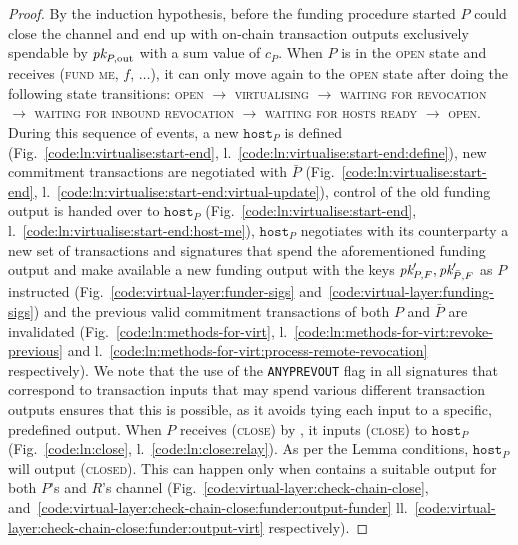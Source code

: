 \begin{proof}
  By the induction hypothesis, before the funding procedure started $P$ could
  close the channel and end up with on-chain transaction outputs exclusively
  spendable by $\textit{pk}_{P, \mathrm{out}}$ with a sum value of $c_P$. When $P$ is in
  the \textsc{open} state and receives (\textsc{fund me}, $f$, $\dots$), it can
  only move again to the \textsc{open} state after doing the following state
  transitions: \textsc{open} $\rightarrow$ \textsc{virtualising} $\rightarrow$
  \textsc{waiting for revocation} $\rightarrow$ \textsc{waiting for inbound
  revocation} $\rightarrow$ \textsc{waiting for hosts ready} $\rightarrow$
  \textsc{open}. During this sequence of events, a new $\texttt{host}_P$ is
  defined (Fig.~\ref{code:ln:virtualise:start-end},
  l.~\ref{code:ln:virtualise:start-end:define}), new commitment transactions are
  negotiated with $\bar{P}$ (Fig.~\ref{code:ln:virtualise:start-end},
  l.~\ref{code:ln:virtualise:start-end:virtual-update}), control of the old
  funding output is handed over to $\texttt{host}_P$
  (Fig.~\ref{code:ln:virtualise:start-end},
  l.~\ref{code:ln:virtualise:start-end:host-me}), $\texttt{host}_P$ negotiates
  with its counterparty a new set of transactions and signatures that spend the
  aforementioned funding output and make available a new funding output with the
  keys $\textit{pk}_{P, F}', \textit{pk}_{\bar{P}, F}'$ as $P$ instructed
  (Fig.~\ref{code:virtual-layer:funder-sigs}
  and~\ref{code:virtual-layer:funding-sigs}) and the previous valid commitment
  transactions of both $P$ and $\bar{P}$ are invalidated
  (Fig.~\ref{code:ln:methods-for-virt},
  l.~\ref{code:ln:methods-for-virt:revoke-previous} and
  l.~\ref{code:ln:methods-for-virt:process-remote-revocation} respectively). We
  note that the use of the \texttt{ANYPREVOUT} flag in all signatures that
  correspond to transaction inputs that may spend various different transaction
  outputs ensures that this is possible, as it avoids tying each input to a
  specific, predefined output. When $P$ receives (\textsc{close}) by
  \environment, it inputs (\textsc{close}) to $\texttt{host}_P$
  (Fig.~\ref{code:ln:close}, l.~\ref{code:ln:close:relay}). As per the Lemma
  conditions, $\texttt{host}_P$ will output (\textsc{closed}). This can happen
  only when \ledger contains a suitable output for both $P$'s and $R$'s channel
  (Fig.~\ref{code:virtual-layer:check-chain-close},
  and~\ref{code:virtual-layer:check-chain-close:funder:output-funder}
  ll.~\ref{code:virtual-layer:check-chain-close:funder:output-virt}
  respectively).


\end{proof}
